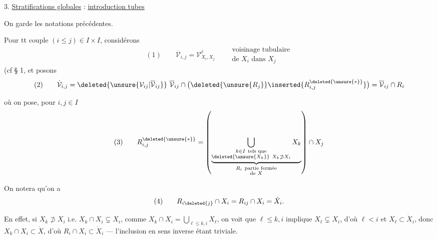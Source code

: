3. \uline{Stratifications globales} : \uline{introduction  tubes}

On garde les notations précédentes.

Pour tt couple $(i\leq j)\in I\times I$, considérons
\[
(1)\qquad \overline{\mathcal V}_{i,j}=\mathcal V^{\ell}_{X_i,X_j}\qquad
\begin{gathered}\text{voisinage tubulaire}\\\text{de }X_i\text{ dans }X_j\end{gathered}
\]
(cf § 1\unsure{)}, et posons
\[
(2)\qquad\dot{\mathcal V}_{i,j}=\deleted{\unsure{\mathcal V_{ij}|\overline{\mathcal V}_{ij}}}\ \overline{\mathcal V}_{ij}\cap\bigl(\deleted{\unsure{R_j}}\inserted{R_{i,j}^{\deleted{\unsure{*}}}}\bigr)=\overline{\mathcal V}_{ij}\cap R_i
\]

où on pose, pour $i,j\in I$
\[
(3)\qquad R_{i,j}^{\deleted{\unsure{*}}}=\left(
\underbrace{\bigcup_{\substack{k\in I\ \text{tels que}\\\deleted{\unsure{X_k}}\ X_k\not\supset X_i}}X_k}_{\substack{R_i\ \text{partie fermée}\\\text{de }X}}
\right)\cap X_j
\]


On notera qu'on a
\[
(4)\qquad R_{i\deleted{j}}\cap X_i=R_{ij}\cap X_i=\dot X_i.
\]

En effet, si $X_k\not\supset X_i$ i.e. $X_k\cap X_i\subsetneq X_i$, comme $X_k\cap X_i=\bigcup_{\ell\leq k,i}X_\ell$, on voit que  $\ell\leq k,i$ implique $X_\ell\subsetneq X_i$, d'où $\ell<i$ et $X_\ell\subset\dot X_i$, donc $X_k\cap X_i\subset\dot X$, d'où $R_i\cap X_i\subset\dot X_i$ — l'inclusion en sens inverse étant triviale.
